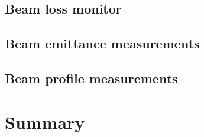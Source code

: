 \begin{refsection}
	\subsection{Beam loss monitor}
	\subsection{Beam emittance measurements}
	\subsection{Beam profile measurements}

	\section{Summary}
	\label{ch2:Summary}
	\printbibliography[heading=subbibliography]
\end{refsection}